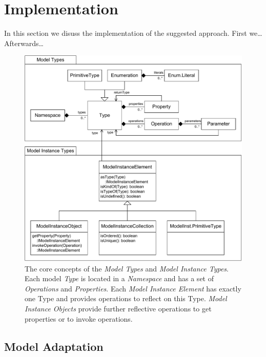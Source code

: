 \section{Implementation}

	In this section we disuss the implementation of the suggested approach.
	First we\ldots Afterwards\ldots
	
	\begin{figure}[!t]
			\centering
				\includegraphics[width=1.00\textwidth]{figures/coreconcepts.pdf}
			\caption{The core concepts of the \textit{Model Types} and \textit{Model Instance Types}. 
			Each model \textit{Type} is located in a \textit{Namespace} and has a set of \textit{Operations} 
			and \textit{Properties}. Each \textit{Model Instance Element} has exactly one Type and provides 
			operations to reflect on this Type. \textit{Model Instance Objects} provide further reflective 
			operations to get properties or to invoke operations.}
			\label{fig:coreconcepts}
		\end{figure}

\subsection{Model Adaptation}

